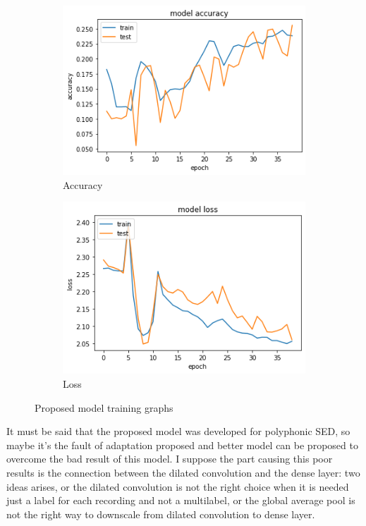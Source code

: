 \documentclass{article}
\begin{document}
\begin{figure}[H]
	\centering
	\begin{subfigure}{.5\textwidth}
		\centering
		\includegraphics[width=.9\linewidth]{./images/mono/new_model_acc.png}
		\caption{Accuracy}
	\end{subfigure}%
	\begin{subfigure}{.5\textwidth}
		\centering
		\includegraphics[width=.9\linewidth]{./images/mono/new_model_loss.png}
		\caption{Loss}
	\end{subfigure}
	\caption{Proposed model training graphs}
	\label{fig:mono_new_result}
\end{figure}

It must be said that the proposed model was developed for polyphonic SED, so maybe it's the fault of adaptation proposed and better model can be proposed to overcome the bad result of this model. I suppose the part causing this poor results is the connection between the dilated convolution and the dense layer: two ideas arises, or the dilated convolution is not the right choice when it is needed just a label for each recording and not a multilabel, or the global average pool is not the right way to downscale from dilated convolution to dense layer.
\end{document}
